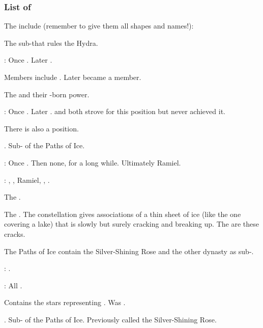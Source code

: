 \subsubsection{List of \matrices}
The \matrices{} include (remember to give them all shapes and names!):

\begin{gloss}
    The sub-\matrix that rules the Hydra. 
    
    \Apex: 
    Once \Nexagglachel.
    Later \Ishnaruchaefir.

    Members include \Rystessakhin.
    Later \Secherdamon became a member. 
  
    The \dragons{} and their \xs-born power. 
    
    \Apex: 
    Once \TyarithXserasshana. 
    Later \Vizsherioch. 
    \Nexagglachel{} and \Secherdamon{} both strove for this position but never achieved it. 
    
    There is also a  position. 

    . 
    Sub-\matrix{} of the Paths of Ice. 
    
    \Apex: 
    Once \Zachirah. 
    Then none, for a long while. 
    Ultimately Ramiel. 
    
    \CardinalPoints: 
    \Nathrach, \Shiaraid, Ramiel, \Dasteron, \Kishiel. 

    The \caisith{} \matrix{}. 
  
    The \banelords.
    The constellation gives associations of a thin sheet of ice (like the one covering a lake) that is slowly but surely cracking and breaking up. 
    The  are these cracks. 
    
    The Paths of Ice contain the Silver-Shining Rose and the other dynasty \matrices{} as sub-\matrices. 
    
    \Apex: 
    \Daggerrain. 
    
    \CardinalPoints: All \banelords. 
  
  \gitemthe{\Malgryph}
    Contains the stars representing . 
    Was . 
  
    \CiriathSepher. 
    Sub-\matrix{} of the Paths of Ice. 
    Previously called the Silver-Shining Rose.
    

\end{gloss}

